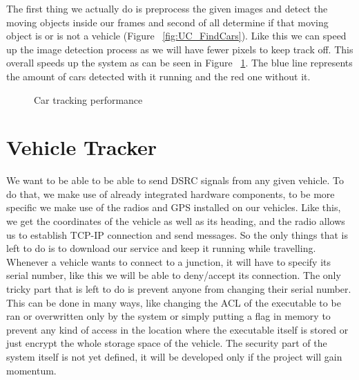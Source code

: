\documentclass[17pt]{report}
\begin{document}
\pagebreak
The first thing we actually do is preprocess the given images and 
detect the moving objects inside our frames and second of all
determine if that moving object is or is not a vehicle (Figure ~\ref{fig:UC_FindCars}).
Like this we can speed up the image detection process as we will have fewer pixels
to keep track off. This overall speeds up the system as can be seen in
Figure ~\ref{fig:Comparison}. The blue line represents the amount of cars 
detected with it running and the red one without it.
\begin{figure}[h!]
    \centering
    \label{fig:Comparison}
    \caption{Car tracking performance}
\end{figure}

\section{Vehicle Tracker}
\indent \indent
We want to be able to be able to send DSRC signals from any given vehicle.
To do that, we make use of already integrated hardware components, to be more
specific we make use of the radios and GPS installed on our vehicles. Like this,
we get the coordinates of the vehicle as well as its heading, and the radio
allows us to establish TCP-IP connection and send messages. So the only things
that is left to do is to download our service and keep it running while travelling.\\
\indent \indent
Whenever a vehicle wants to connect to a junction, it will have to specify its 
serial number, like this we will be able to deny/accept its connection. The only 
tricky part that is left to do is prevent anyone from changing their serial number.
This can be done in many ways, like changing the ACL of the executable to be 
ran or overwritten only by the system or simply putting a flag in memory to 
prevent any kind of access in the location where the executable itself is stored or 
just encrypt the whole storage space of the vehicle. The security part of the
system itself is not yet defined, it will be developed only if the project will gain momentum.
\pagebreak
\end{document}
